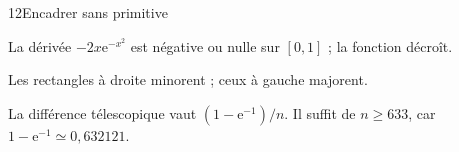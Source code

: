 \begin{corrige}{12}{Encadrer sans primitive}
\begin{questions}
\item La dérivée $-2x\mathrm e^{-x^2}$ est négative ou nulle sur $[0,1]$ ; la fonction décroît.
\item Les rectangles à droite minorent ; ceux à gauche majorent.
\item La différence télescopique vaut $(1-\mathrm e^{-1})/n$. Il suffit de $n\geq633$, car $1-\mathrm e^{-1}\simeq0{,}632121$.
\end{questions}
\end{corrige}
